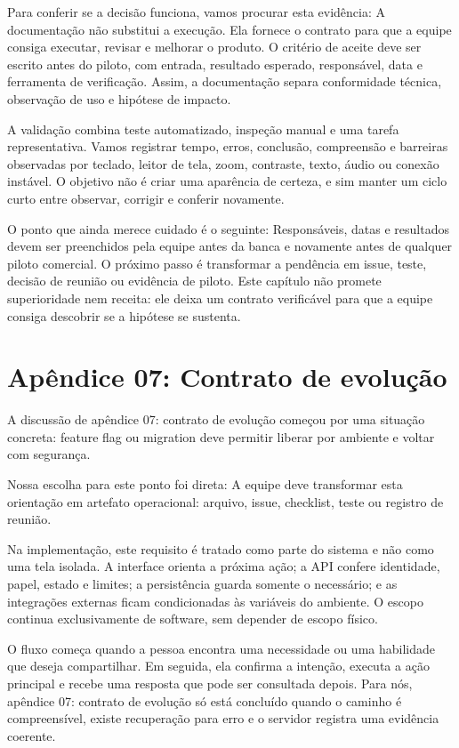\documentclass[12pt,oneside,a4paper,article]{abntex2}
\begin{document}
Para conferir se a decisão funciona, vamos procurar esta evidência: A documentação não substitui a execução. Ela fornece o contrato para que a equipe consiga executar, revisar e melhorar o produto. O critério de aceite deve ser escrito antes do piloto, com entrada, resultado esperado, responsável, data e ferramenta de verificação. Assim, a documentação separa conformidade técnica, observação de uso e hipótese de impacto.

A validação combina teste automatizado, inspeção manual e uma tarefa representativa. Vamos registrar tempo, erros, conclusão, compreensão e barreiras observadas por teclado, leitor de tela, zoom, contraste, texto, áudio ou conexão instável. O objetivo não é criar uma aparência de certeza, e sim manter um ciclo curto entre observar, corrigir e conferir novamente.

O ponto que ainda merece cuidado é o seguinte: Responsáveis, datas e resultados devem ser preenchidos pela equipe antes da banca e novamente antes de qualquer piloto comercial. O próximo passo é transformar a pendência em issue, teste, decisão de reunião ou evidência de piloto. Este capítulo não promete superioridade nem receita: ele deixa um contrato verificável para que a equipe consiga descobrir se a hipótese se sustenta.

\section{Apêndice 07: Contrato de evolução}
A discussão de apêndice 07: contrato de evolução começou por uma situação concreta: feature flag ou migration deve permitir liberar por ambiente e voltar com segurança.

Nossa escolha para este ponto foi direta: A equipe deve transformar esta orientação em artefato operacional: arquivo, issue, checklist, teste ou registro de reunião.

Na implementação, este requisito é tratado como parte do sistema e não como uma tela isolada. A interface orienta a próxima ação; a API confere identidade, papel, estado e limites; a persistência guarda somente o necessário; e as integrações externas ficam condicionadas às variáveis do ambiente. O escopo continua exclusivamente de software, sem depender de escopo físico.

O fluxo começa quando a pessoa encontra uma necessidade ou uma habilidade que deseja compartilhar. Em seguida, ela confirma a intenção, executa a ação principal e recebe uma resposta que pode ser consultada depois. Para nós, apêndice 07: contrato de evolução só está concluído quando o caminho é compreensível, existe recuperação para erro e o servidor registra uma evidência coerente.
\end{document}
